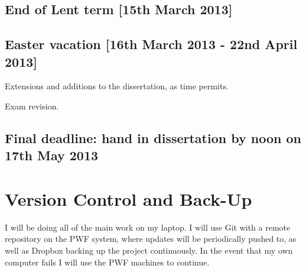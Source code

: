\documentclass[12pt,twoside,notitlepage]{report}
\begin{document}
\subsection*{End of Lent term [15th March 2013]}

\subsection*{Easter vacation [16th March 2013 - 22nd April 2013]}
Extensions and additions to the dissertation, as time permits.

Exam revision.

\subsection*{Final deadline: hand in dissertation by noon on 17th May 2013}

\section*{Version Control and Back-Up}
I will be doing all of the main work on my laptop. I will use Git with a remote repository on the PWF system, where updates will be periodically pushed to, as well as Dropbox backing up the project continuously.
In the event that my own computer fails I will use the PWF machines to continue.
\end{document}
